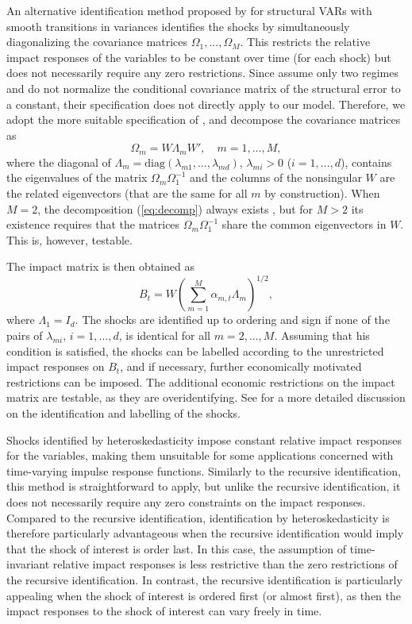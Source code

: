 \documentclass[nojss]{jss}
\begin{document}
An alternative identification method proposed by \cite{Lutkepohl+Netsunajev:2017} for structural VARs with smooth transitions in variances \citep[see also the seminal paper by][]{Rigobon:2003} identifies the shocks by simultaneously diagonalizing the covariance matrices $\Omega_1,...,\Omega_M$. This restricts the relative impact responses of the variables to be constant over time (for each shock) but does not necessarily require any zero restrictions. Since \cite{Lutkepohl+Netsunajev:2017} assume only two regimes and do not normalize the conditional covariance matrix of the structural error to a constant, their specification does not directly apply to our model. Therefore, we adopt the more suitable specification of \cite{Virolainen:2024}, and decompose the covariance matrices as
\begin{equation}\label{eq:decomp}
\Omega_m=W\Lambda_mW', \quad m=1,...,M,
\end{equation}
where the diagonal of $\Lambda_m=\text{diag}(\lambda_{m1},...,\lambda_{md})$, $\lambda_{mi}>0$ ($i=1,...,d$), contains the eigenvalues of the matrix $\Omega_m\Omega_1^{-1}$ and the columns of the nonsingular $W$ are the related eigenvectors (that are the same for all $m$ by construction). When $M=2$, the decomposition (\ref{eq:decomp}) always exists \citep[Theorem A9.9]{Muirhead:1982}, but for $M>2$ its existence requires that the matrices $\Omega_m\Omega_1^{-1}$ share the common eigenvectors in $W$. This is, however, testable.

The impact matrix is then obtained as
\begin{equation}
B_t=W\left(\sum_{m=1}^M\alpha_{m,t}\Lambda_m\right)^{1/2},
\end{equation}
where $\Lambda_1=I_d$. The shocks are identified up to ordering and sign if none of the pairs of $\lambda_{mi}$, $i=1,...,d$, is identical for all $m=2,...,M$. Assuming that his condition is satisfied, the shocks can be labelled according to the unrestricted impact responses on $B_t$, and if necessary, further economically motivated restrictions can be imposed. The additional economic restrictions on the impact matrix are testable, as they are overidentifying. See \cite{Virolainen:2024} for a more detailed discussion on the identification and labelling of the shocks.

Shocks identified by heteroskedasticity impose constant relative impact responses for the variables, making them unsuitable for some applications concerned with time-varying impulse response functions. Similarly to the recursive identification, this method is straightforward to apply, but unlike the recursive identification, it does not necessarily require any zero constraints on the impact responses. Compared to the recursive identification, identification by heteroskedasticity is therefore particularly advantageous when the recursive identification would imply that the shock of interest is order last. In this case, the assumption of time-invariant relative impact responses is less restrictive than the zero restrictions of the recursive identification. In contrast, the recursive identification is particularly appealing when the shock of interest is ordered first (or almost first), as then the impact responses to the shock of interest can vary freely in time.
\end{document}
